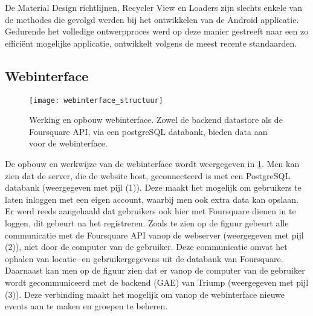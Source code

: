 De Material Design richtlijnen, Recycler View en Loaders zijn slechts enkele van de methodes die gevolgd werden bij het ontwikkelen van de Android applicatie. Gedurende het volledige ontwerpproces werd op deze manier gestreeft naar een zo efficiënt mogelijke applicatie, ontwikkelt volgens de meest recente standaarden. \cite{successapp}
\subsection{Webinterface}
\begin{figure}[H]
	\centering
	\texttt{[image: webinterface\_structuur]}
	\caption{Werking en opbouw webinterface. Zowel de backend datastore als de Foursquare API, via een postgreSQL databank, bieden data aan voor de webinterface. }
	\label{fig:Webinterface}
\end{figure}
De opbouw en werkwijze van de webinterface wordt weergegeven in \ref{fig:Webinterface}. Men kan zien dat de server, die de website host, geconnecteerd is met een PostgreSQL databank (weergegeven met pijl (1)). Deze maakt het mogelijk om gebruikers te laten inloggen met een eigen account, waarbij men ook extra data kan opslaan. Er werd reeds aangehaald dat gebruikers ook hier met Foursquare dienen in te loggen, dit gebeurt na het registreren. Zoals te zien op de figuur gebeurt alle communicatie met de Foursquare API vanop de webserver (weergegeven met pijl (2)), niet door de computer van de gebruiker. Deze communicatie omvat het ophalen van locatie- en gebruikergegevens uit de databank van Foursquare.
Daarnaast kan men op de figuur zien dat er vanop de computer van de gebruiker wordt gecommuniceerd met de backend (GAE) van Triump (weergegeven met pijl (3)). Deze verbinding maakt het mogelijk om vanop de webinterface nieuwe events aan te maken en groepen te beheren.

